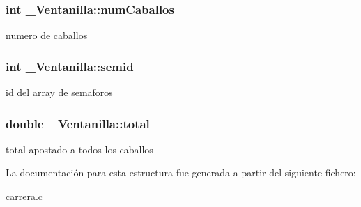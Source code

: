 \subsubsection[{\texorpdfstring{num\+Caballos}{numCaballos}}]{\setlength{\rightskip}{0pt plus 5cm}int \+\_\+\+Ventanilla\+::num\+Caballos}\hypertarget{struct__Ventanilla_a9d1361c0811ea37ac86765ed0ad50a8f}{}\label{struct__Ventanilla_a9d1361c0811ea37ac86765ed0ad50a8f}
numero de caballos 
\subsubsection[{\texorpdfstring{semid}{semid}}]{\setlength{\rightskip}{0pt plus 5cm}int \+\_\+\+Ventanilla\+::semid}\hypertarget{struct__Ventanilla_a2834f69015926e1879286fe9af2a72b3}{}\label{struct__Ventanilla_a2834f69015926e1879286fe9af2a72b3}
id del array de semaforos 
\subsubsection[{\texorpdfstring{total}{total}}]{\setlength{\rightskip}{0pt plus 5cm}double \+\_\+\+Ventanilla\+::total}\hypertarget{struct__Ventanilla_a1b4846eb8da9d38419a3f918fe9665c1}{}\label{struct__Ventanilla_a1b4846eb8da9d38419a3f918fe9665c1}
total apostado a todos los caballos 

La documentación para esta estructura fue generada a partir del siguiente fichero\+:\begin{DoxyCompactItemize}
\item 
\hyperlink{carrera_8c}{carrera.\+c}\end{DoxyCompactItemize}

